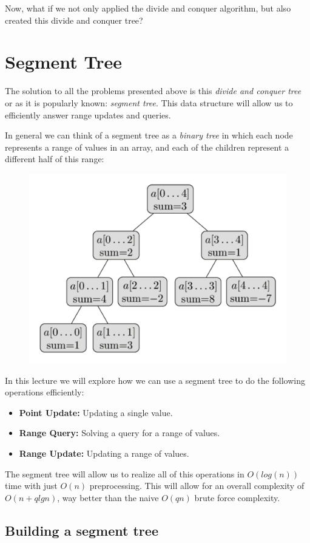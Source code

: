 \documentclass{article}
\begin{document}
Now, what if we not only applied the divide and conquer algorithm, but also created this divide and conquer tree? 

\section{Segment Tree}

The solution to all the problems presented above is this \textit{divide and conquer tree} or as it is popularly known: \textit{segment tree}. This data structure will allow us to efficiently answer range updates and queries.

In general we can think of a segment tree as a \textit{binary tree} in which each node represents a range of values in an array, and each of the children represent a different half of this range:

\begin{figure}[H]
	\centering
	\includegraphics[width=0.5\linewidth]{images/segment-tree}
\end{figure}


In this lecture we will explore how we can use a segment tree to do the following operations efficiently:

\begin{itemize}
	\item \textbf{Point Update:} Updating a single value.
	\item \textbf{Range Query:} Solving a query for a range of values.
	\item \textbf{Range Update:} Updating a range of values.
\end{itemize}

The segment tree will allow us to realize all of this operations in $O(log(n))$ time with just $O(n)$ preprocessing. This will allow for an overall complexity of $O(n + qlgn)$, way better than the naive $O(qn)$ brute force complexity.

\subsection{Building a segment tree}
\end{document}
